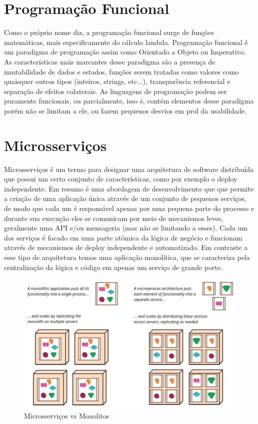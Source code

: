 	\section{Programação Funcional}
	
	Como o próprio nome diz, a programação funcional surge de funções matemáticas, mais especificamente do cálculo lambda. Programação funcional é um paradigma de programação assim como Orientado a Objeto ou Imperativo. As características mais marcantes desse paradigma são a presença de imutabilidade de dados e estados, funções serem tratadas como valores como quaisquer outros tipos (inteiros, strings, etc...), transparência referencial e separação de efeitos colaterais.
	As linguagens de programação podem ser puramente funcionais, ou parcialmente, isso é, contém elementos desse paradigma porém não se limitam a ele, ou fazem pequenos desvios em prol da usabilidade.
	
	\section{Microsserviços}
	
	Microsserviços é um termo para designar uma arquitetura de software distribuída que possui um certo conjunto de características, como por exemplo o deploy independente. Em resumo é uma abordagem de desenvolvimento que que permite a criação de uma aplicação única através de um conjunto de pequenos serviços, de modo que cada um é responsável apenas por uma pequena parte do processo e durante sua execução eles se comunicam por meio de mecanismos leves, geralmente uma API e/ou mensageria (mas não se limitando a esses). Cada um dos serviços é focado em uma parte atômica da lógica de negócio e funcionam através de mecanismos de deploy independente e automatizado. Em contraste a esse tipo de arquitetura temos uma aplicação monolítica, que se caracteriza pela centralização da lógica e código em apenas um serviço de grande porte. \cite{microsservicos}
	
	\begin{figure}[htpb]
	    \caption{Microsserviços vs Monolitos}
	    \begin{center}
	        \includegraphics[scale=0.4]{pictures/sketch_microservices.png}
	    \end{center}
	    \label{fig:microsservicos_vs_monolito}
	\end{figure}
	
